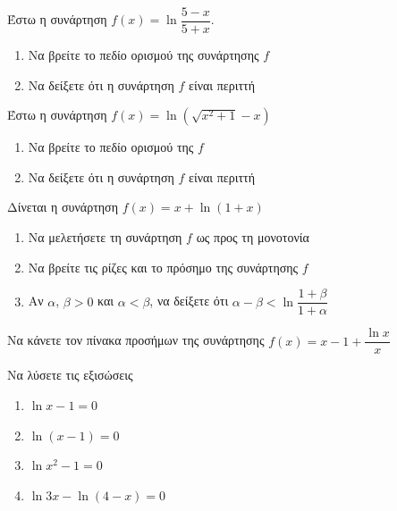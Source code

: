 \documentclass[greek]{beamer}
\begin{document}
\begin{askisi}
  Έστω η συνάρτηση $f(x)=\ln \dfrac{5-x}{5+x}$.
  \begin{enumerate}
    \item<1-> Να βρείτε το πεδίο ορισμού της συνάρτησης $f$
    \item<2-> Να δείξετε ότι η συνάρτηση $f$ είναι περιττή
  \end{enumerate}


\end{askisi}

\begin{askisi}
  Έστω η συνάρτηση $f(x)=\ln \left( \sqrt{x^2+1}-x \right) $
  \begin{enumerate}
    \item<1-> Να βρείτε το πεδίο ορισμού της $f$
    \item<2-> Να δείξετε ότι η συνάρτηση $f$ είναι περιττή
  \end{enumerate}


\end{askisi}

\begin{askisi}
  Δίνεται η συνάρτηση $f(x)=x+\ln(1+x)$
  \begin{enumerate}
    \item<1-> Να μελετήσετε τη συνάρτηση $f$ ως προς τη μονοτονία
    \item<2-> Να βρείτε τις ρίζες και το πρόσημο της συνάρτησης $f$
    \item<3-> Αν $α$, $β>0$ και $α<β$, να δείξετε ότι $α-β<\ln \dfrac{1+β}{1+α}$
  \end{enumerate}


\end{askisi}

\begin{askisi}
  Να κάνετε τον πίνακα προσήμων της συνάρτησης $f(x)=x-1+\dfrac{\ln x}{x}$


\end{askisi}

\begin{askisi}
  Να λύσετε τις εξισώσεις
  \begin{enumerate}
    \item<1-> $\ln x-1=0$
    \item<2-> $\ln (x-1)=0$
    \item<3-> $\ln x^2-1=0$
    \item<4-> $\ln 3x-\ln(4-x)=0$
  \end{enumerate}


\end{askisi}
\end{document}
